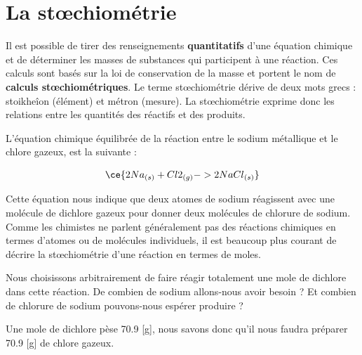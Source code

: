 \documentclass[
  11pt,
  a4paper,
  openany]{book}
\begin{document}
\section{La stœchiométrie}\label{la-stux153chiomuxe9trie}

Il est possible de tirer des renseignements \textbf{quantitatifs} d'une équation chimique et de déterminer les masses de substances qui participent à une réaction. Ces calculs sont basés sur la loi de conservation de la masse et portent le nom de \textbf{calculs stœchiométriques}. Le terme stœchiométrie dérive de deux mots grecs : stoikheîon (élément) et métron (mesure). La stœchiométrie exprime donc les relations entre les quantités des réactifs et des produits.

L'équation chimique équilibrée de la réaction entre le sodium métallique et le chlore gazeux, est la suivante :

\[ \ce{ 2 Na{}_{(s)} + Cl2{}_{(g)} -> 2 NaCl{}_{(s)} } \]

Cette équation nous indique que deux atomes de sodium réagissent avec une molécule de dichlore gazeux pour donner deux molécules de chlorure de sodium. Comme les chimistes ne parlent généralement pas des réactions chimiques en termes d'atomes ou de molécules individuels, il est beaucoup plus courant de décrire la stœchiométrie d'une réaction en termes de moles.

Nous choisissons arbitrairement de faire réagir totalement une mole de dichlore dans cette réaction. De combien de sodium allons-nous avoir besoin ? Et combien de chlorure de sodium pouvons-nous espérer produire ?

Une mole de dichlore pèse 70.9 {[}g{]}, nous savons donc qu'il nous faudra préparer 70.9 {[}g{]} de chlore gazeux.
\end{document}
